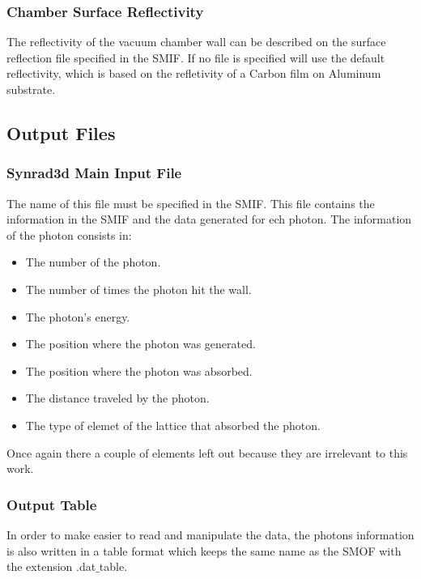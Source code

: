 \subsubsection*{Chamber Surface Reflectivity}
The reflectivity of the vacuum chamber wall can be described on the surface reflection file specified in the SMIF. If no file is specified \srthree will use the default reflectivity, which  is based on the refletivity of a Carbon film on Aluminum substrate. 

\subsection{Output Files}

\subsubsection*{Synrad3d Main Input File}
The name of this file must be specified in the SMIF. This file contains the information in the SMIF and the data generated for ech photon. The information of the photon consists in:
\begin{itemize}
\item The number of the photon.
\item The number of times the photon hit the wall.
\item The photon's energy.
\item The position where the photon was generated.
\item The position where the photon was absorbed.
\item The distance traveled by the photon.
\item The type of elemet of the lattice that absorbed the photon.
\end{itemize}

Once again there a couple of elements left out because they are irrelevant to this work.

\subsubsection*{Output Table}

In order to make easier to read and manipulate the data, the photons information is also written in a table format which keeps the same name as the SMOF with the extension .dat$\_$table.
 


